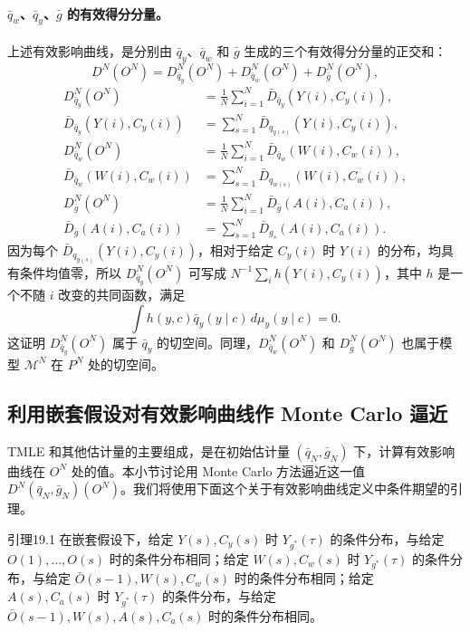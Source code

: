 \paragraph{$\bar q_w$、$\bar q_y$、$\bar g$ 的有效得分分量。}
上述有效影响曲线，是分别由 $\bar q_y$、$\bar q_w$ 和 $\bar g$ 生成的三个有效得分分量的正交和：
\[
 D^N(O^N)=D^N_{\bar q_y}(O^N)+D^N_{\bar q_w}(O^N)+D^N_{\bar g}(O^N),
\]
\[
\begin{aligned}
 D^N_{\bar q_y}(O^N)&=\frac1N\sum_{i=1}^N\bar D_{\bar q_y}(Y(i),C_y(i)),\\
 \bar D_{\bar q_y}(Y(i),C_y(i))&=\sum_{s=1}^N\bar D_{q_{y(s)}}(Y(i),C_y(i)),\\
 D^N_{\bar q_w}(O^N)&=\frac1N\sum_{i=1}^N\bar D_{\bar q_w}(W(i),C_w(i)),\\
 \bar D_{\bar q_w}(W(i),C_w(i))&=\sum_{s=1}^N\bar D_{q_{w(s)}}(W(i),C_w(i)),\\
 D^N_{\bar g}(O^N)&=\frac1N\sum_{i=1}^N\bar D_{\bar g}(A(i),C_a(i)),\\
 \bar D_{\bar g}(A(i),C_a(i))&=\sum_{s=1}^N\bar D_{g_s}(A(i),C_a(i)).
\end{aligned}
\]
因为每个 $\bar D_{q_{y(s)}}(Y(i),C_y(i))$，相对于给定 $C_y(i)$ 时 $Y(i)$ 的分布，均具有条件均值零，所以 $D^N_{\bar q_y}(O^N)$ 可写成 $N^{-1}\sum_i h(Y(i),C_y(i))$，其中 $h$ 是一个不随 $i$ 改变的共同函数，满足
\[
 \int h(y,c)\bar q_y(y\mid c)\,d\mu_y(y\mid c)=0.
\]
这证明 $D^N_{\bar q_y}(O^N)$ 属于 $\bar q_y$ 的切空间。同理，$D^N_{\bar q_w}(O^N)$ 和 $D^N_{\bar g}(O^N)$ 也属于模型 $\mathcal M^N$ 在 $P^N$ 处的切空间。

\subsection{利用嵌套假设对有效影响曲线作 Monte Carlo 逼近}

TMLE 和其他估计量的主要组成，是在初始估计量 $(\bar q_N,\bar g_N)$ 下，计算有效影响曲线在 $O^N$ 处的值。本小节讨论用 Monte Carlo 方法逼近这一值 $D^N(\bar q_N,\bar g_N)(O^N)$。我们将使用下面这个关于有效影响曲线定义中条件期望的引理。

\begin{bookresult}{引理}{19.1}
在嵌套假设下，给定 $Y(s),C_y(s)$ 时 $Y_{g^*}(\tau)$ 的条件分布，与给定 $O(1),\ldots,O(s)$ 时的条件分布相同；给定 $W(s),C_w(s)$ 时 $Y_{g^*}(\tau)$ 的条件分布，与给定 $\bar O(s-1),W(s),C_w(s)$ 时的条件分布相同；给定 $A(s),C_a(s)$ 时 $Y_{g^*}(\tau)$ 的条件分布，与给定 $\bar O(s-1),W(s),A(s),C_a(s)$ 时的条件分布相同。
\end{bookresult}

